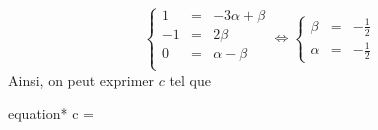 \documentclass[../main/main.tex]{subfiles}
\begin{document}
{\begin{tcb}[sidebyside]
		\[ \left\{
			\begin{array}{rcl}
				1  & = & -3\alpha + \beta \\
				-1 & = & 2\beta           \\
				0  & = & \alpha - \beta   \\
			\end{array}
			\right. \Longleftrightarrow \left\{
			\begin{array}{rcl}
				\beta  & = & - \frac{1}{2} \\
				\alpha & = & - \frac{1}{2}
			\end{array}
			\right.\]
		Ainsi, on peut exprimer $c$ tel que
		\begin{empheq}[box=\fbox]{equation*}
			c = 
		\end{empheq}
	\end{tcb}
}
\end{document}
